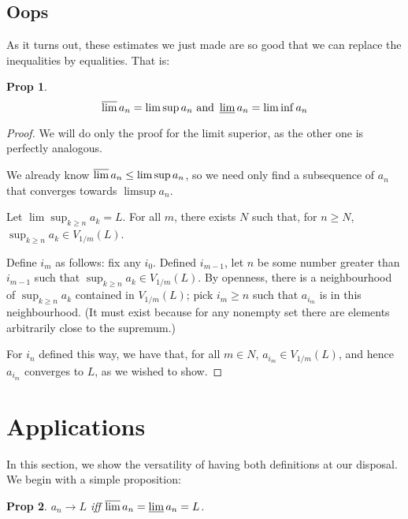 \documentclass{article}
\newtheorem{prop}{Prop}
\theoremstyle{definition}
\begin{document}
	\subsection{Oops}
	
	As it turns out, these estimates we just made are so good that we can replace the inequalities by equalities. That is:
	
	\begin{prop}
	\[\varlimsup a_n = \limsup a_n \text{ and } \varliminf a_n = \liminf a_n\]
	\end{prop}
	
	\begin{proof}
	We will do only the proof for the limit superior, as the other one is perfectly analogous.
	
	We already know $\varlimsup a_n \leq \limsup a_n$, so we need only find a subsequence of $a_n$ that converges towards $\limsup a_n$.
	
	Let $\lim \sup_{k \geq n} a_k = L$. For all $m$, there exists $N$ such that, for $n \geq N$, $\sup_{k \geq n} a_k \in V_{1/m}(L)$.
	
	Define $i_m$ as follows: fix any $i_0$. Defined $i_{m-1}$, let $n$ be some number greater than $i_{m-1}$ such that $\sup_{k \geq n} a_k \in V_{1/m}(L)$. By openness, there is a neighbourhood of $\sup_{k \geq n} a_k$ contained in $V_{1/m}(L)$; pick $i_m \geq n$ such that $a_{i_m}$ is in this neighbourhood. (It must exist because for any nonempty set there are elements arbitrarily close to the supremum.)
	
	For $i_n$ defined this way, we have that, for all $m \in N$, $a_{i_m} \in V_{1/m}(L)$, and hence $a_{i_m}$ converges to $L$, as we wished to show.
	\end{proof}
	
	\section{Applications}
	
	In this section, we show the versatility of having both definitions at our disposal. We begin with a simple proposition:
	
	\begin{prop}
	$a_n \rightarrow L$ iff $\varlimsup a_n = \varliminf a_n = L$.
	\end{prop}
	
\end{document}
